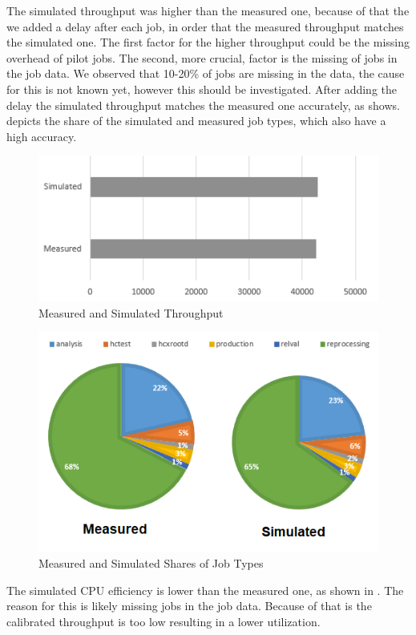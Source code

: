 \documentclass[runningheads,a4paper]{llncs}[2017/09/04]
\begin{document}
The simulated throughput was higher than the measured one, because of that the we added a delay after each job, in order that the measured throughput matches the simulated one. The first factor for the higher throughput could be the missing overhead of pilot jobs. The second, more crucial, factor is the missing of jobs in the job data. We observed that 10-20\% of jobs are missing in the data, the cause for this is not known yet, however this should be investigated. 
After adding the delay the simulated throughput matches the measured one accurately, as  shows.
 depicts the share of the simulated and measured job types, which also have a high accuracy.
\begin{figure}
	\centering
	\includegraphics[scale = 0.4]{images/durchsatz}
	\caption[]{Measured and Simulated Throughput}
	\label{throughput}
\end{figure}
\begin{figure}
	\centering
	\includegraphics[scale = 0.4]{images/shares}
	\caption[]{Measured and Simulated Shares of Job Types}
	\label{shares}
\end{figure}


The simulated CPU efficiency is lower than the measured one, as shown in . The reason for this is likely missing jobs in the job data. Because of that is the calibrated throughput is too low resulting in a lower utilization.
\end{document}
